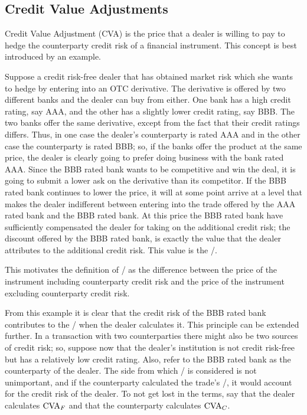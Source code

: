 \documentclass[main.tex]{subfiles}
\begin{document}
    \subsection{Credit Value Adjustments}
        Credit Value Adjustment (CVA) is the price that a dealer is willing to pay 
        to hedge the counterparty credit risk of a financial instrument.
        This concept is best introduced by an example. 
        
        \begin{example}
        Suppose a credit risk-free dealer that has obtained market risk 
        which she wants to hedge by entering into an OTC derivative.
        The derivative is offered by two different banks and the dealer can buy from either.
        One bank has a high credit rating, say AAA, and the other has a slightly lower credit rating, say BBB. 
        The two banks offer the same derivative, except from the fact that their credit ratings differs.
        Thus, in one case the dealer's counterparty is rated AAA and in the other case the counterparty is rated BBB;
        so, if the banks offer the product at the same price, 
        the dealer is clearly going to prefer doing business with the bank rated AAA.
        Since the BBB rated bank wants to be competitive and win the deal,
        it is going to submit a lower ask on the derivative than its competitor.
        If the BBB rated bank continues to lower the price, it will at some point arrive at a level
        that makes the dealer indifferent between entering into the trade 
        offered by the AAA rated bank and the BBB rated bank.
        At this price the BBB rated bank have sufficiently compensated the dealer for taking on the additional credit risk;
        the discount offered by the BBB rated bank, 
        is exactly the value that the dealer attributes to the additional credit risk. 
        This value is the \CVA/.

        This motivates the definition of \CVA/ as the difference between the price of the instrument 
        including counterparty credit risk and the price of the instrument excluding counterparty credit risk.
        \end{example}

        From this example it is clear that the credit risk of the BBB rated bank contributes to the \CVA/
        when the dealer calculates it.
        This principle can be extended further.
        In a transaction with two counterparties there might also be two sources of credit risk;
        so, suppose now that the dealer's institution is not credit risk-free 
        but has a relatively low credit rating.
        Also, refer to the BBB rated bank as the counterparty of the dealer.
        The side from which \CVA/ is considered is not unimportant,
        and if the counterparty calculated the trade's \CVA/, it would account for the credit risk of the dealer.
        To not get lost in the terms, say that the dealer calculates $\CVA/_{F}$ 
        and that the counterparty calculates $\CVA/_{C}$.
\end{document}
